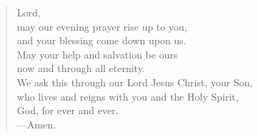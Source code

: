 \prayer

\setlength{\leftmargini}{\prayerleftmargini}

\begin{verse}
Lord,\\
may our evening prayer rise up to you,\\
and your blessing come down upon us.\\
May your help and salvation be ours\\
now and through all eternity.\\
We ask this through our Lord Jesus Christ, your Son,\\
who lives and reigns with you and the Holy Spirit,\\
God, for ever and ever.\\
{\color{red}---\thinspace}Amen.
\end{verse}

\setlength{\leftmargini}{\defleftmargini}